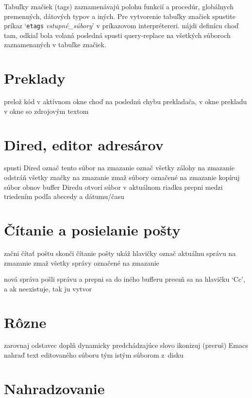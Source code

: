 Tabuľky značiek (tags) zaznamenávajú polohu funkcií a procedúr, globálnych
premenných, dátových typov a iných. Pre vytvorenie tabuľky značiek spustite
príkaz `{\tt etags} {\it vstupné\_súbory}' v príkazovom interprétereri.
\askip
{} nájdi definícu
 choď tam, odkiaľ bola volaná posledná 
 spusti query-replace na všetkých súboroch
zaznamenaných v tabuľke značiek.

\section{Preklady}

 prelož kód v aktívnom okne
 choď na poslednú chybu prekladača, v okne prekladu
 v okne so zdrojovým textom

\section{Dired, editor adresárov}

 spusti Dired
 označ tento súbor na zmazanie
\key{\~{}} označ všetky zálohy na zmazanie
 odstráň všetky značky na zmazanie
 zmaž súbory označené na zmazanie
 kopíruj súbor
 obnov buffer Diredu
 otvorí súbor v aktuálnom riadku
 prepni medzi triedením podľa abecedy a dátumu/času

\section{Čítanie a posielanie pošty}

 začni čítať poštu
 skonči čítanie pošty
 ukáž hlavičky
 označ aktuálnu správu na zmazanie
 zmaž všetky správy označené na zmazanie

 nová správa
 pošli správu a prepni sa do iného bufferu
 presuň sa na hlavičku `Cc', a ak neexistuje, tak ju
vytvor

\section{Rôzne}

 zarovnaj odstavec
 doplň dynamicky predchádzajúce slovo
 ikonizuj (preruš) Emacs
 nahraď text editovaného súboru tým istým súborom z~disku

\section{Nahradzovanie}

